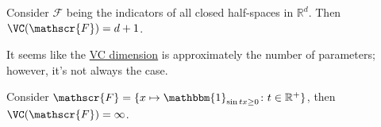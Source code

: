 \begin{eg}
  Consider \(\mathscr{F} \) being the indicators of all closed half-spaces in \(\mathbb{R} ^d\). Then \(\VC(\mathscr{F} ) = d+1 \).
\end{eg}

It seems like the \hyperref[def:VC-dimension]{VC dimension} is approximately the number of parameters; however, it's not always the case.

\begin{eg}
  Consider \(\mathscr{F} = \{ x \mapsto \mathbbm{1}_{\sin tx \geq 0} \colon t \in \mathbb{R} ^+\} \), then \(\VC(\mathscr{F} ) = \infty \).
\end{eg}